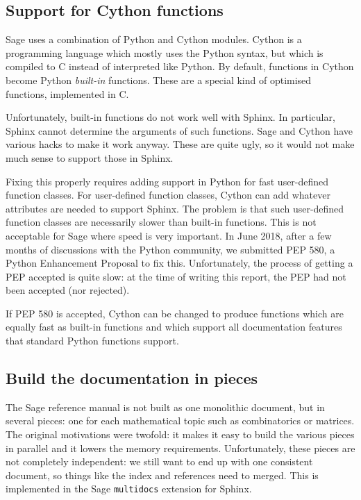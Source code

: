 \documentclass{deliverablereport}
\begin{document}
\subsection{Support for Cython functions}

Sage uses a combination of Python and Cython modules.
Cython is a programming language which mostly uses the Python syntax,
but which is compiled to C instead of interpreted like Python.
By default, functions in Cython become Python \emph{built-in} functions.
These are a special kind of optimised functions, implemented in C.

Unfortunately, built-in functions do not work well with Sphinx.
In particular, Sphinx cannot determine the arguments of such functions.
Sage and Cython have various hacks to make it work anyway.
These are quite ugly, so it would not make much sense to support those in Sphinx.

Fixing this properly requires adding support in Python
for fast user-defined function classes.
For user-defined function classes, Cython can add whatever attributes
are needed to support Sphinx.
The problem is that such user-defined function classes
are necessarily slower than built-in functions.
This is not acceptable for Sage where speed is very important.
In June 2018, after a few months of discussions with the Python
community,
we submitted PEP 580, a Python Enhancement Proposal to fix this.
Unfortunately, the process of getting a PEP accepted is quite slow:
at the time of writing this report, the PEP had not been accepted (nor rejected).

If PEP 580 is accepted, Cython can be changed to produce
functions which are equally fast as built-in functions
and which support all documentation
features that standard Python functions support.

\subsection{Build the documentation in pieces}

The Sage reference manual is not built as one monolithic document,
but in several pieces:
one for each mathematical topic such as combinatorics or matrices.
The original motivations were twofold: it makes it easy to build the various pieces
in parallel and it lowers the memory requirements.
Unfortunately, these pieces are not completely independent:
we still want to end up with one consistent document,
so things like the index and references need to merged.
This is implemented in the Sage \texttt{multidocs} extension for Sphinx.
\end{document}
